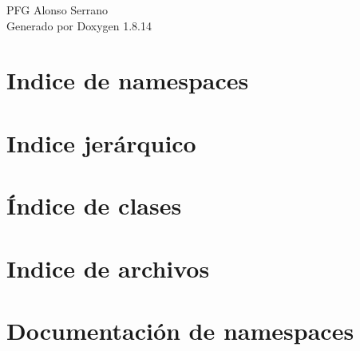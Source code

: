 \documentclass[twoside]{book}
\newcommand{\+}{\discretionary{\mbox{\scriptsize$\hookleftarrow$}}{}{}}
\newcommand{\clearemptydoublepage}{%
  \newpage{\pagestyle{empty}\cleardoublepage}%
}
\begin{document}
\hypersetup{pageanchor=false,
             bookmarksnumbered=true,
             pdfencoding=unicode
            }
\begin{titlepage}
\vspace*{7cm}
\begin{center}%
{\Large P\+FG Alonso Serrano }\\
\vspace*{1cm}
{\large Generado por Doxygen 1.8.14}\\
\end{center}
\end{titlepage}
\clearemptydoublepage
{}
\tableofcontents
\clearemptydoublepage
{}
\hypersetup{pageanchor=true}

\chapter{Indice de namespaces}

\chapter{Indice jerárquico}

\chapter{Índice de clases}

\chapter{Indice de archivos}

\chapter{Documentación de namespaces}













\end{document}
